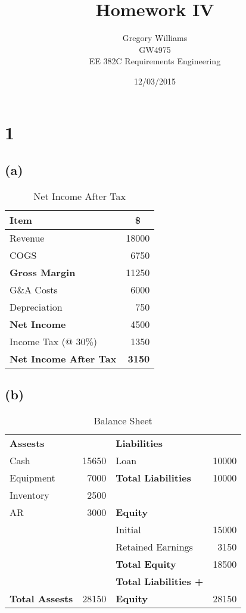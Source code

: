 \documentclass{article}
\title{Homework IV}
\author{Gregory Williams\\GW4975\\EE 382C Requirements Engineering}
\date{12/03/2015}
\newcommand{\ra}[1]{\renewcommand{\arraystretch}{#1}}
\begin{document}
	\maketitle
	
	\section*{1}
	\subsection*{(a)}

	\begin{center}
	\begin{table*}[ht!]
	\centering
	\ra{1.3}
	\begin{tabular}{@{}lr@{}} \toprule
	Item & \multicolumn{1}{c}{\$} \\
	\midrule
	Revenue & 18000\\
	COGS 	& \color{red}6750\\  \midrule
	\textbf{Gross Margin} & 11250\\
	G\&A Costs & \color{red}6000\\
	Depreciation & \color{red}750\\\midrule
	\textbf{Net Income} & 4500\\ 
	Income Tax (@ 30\%) & \color{red}1350\\ \midrule
	\textbf{Net Income After Tax} & \textbf{3150}
	\end{tabular}
	\caption{Net Income After Tax}
	\end{table*}
	\end{center}
	
	\pagebreak
	
	\subsection*{(b)}

	\begin{center}
	\begin{table*}[ht!]
	\centering
	\ra{1.3}
	\begin{tabular}{@{}lrlr@{}} \toprule
	\textbf{Assests} && \textbf{Liabilities} & \\
	\cmidrule{1-1}\cmidrule{3-3}
	Cash & 15650 & Loan & 10000\\
	Equipment 	& 7000 & \textbf{Total Liabilities} & 10000\\
	Inventory & 2500 && \\
	AR & 3000 & \textbf{Equity} &\\ \cmidrule{3-3}
	&& Initial & 15000\\
	&& Retained Earnings & 3150\\ 
	&& \textbf{Total Equity} & 18500\\\midrule
	&& \textbf{Total Liabilities +} &\\
	\textbf{Total Assests} & 28150 & \textbf{Equity} & 28150\\
	\end{tabular}
	\caption{Balance Sheet}
	\end{table*}
	\end{center}
\end{document}
